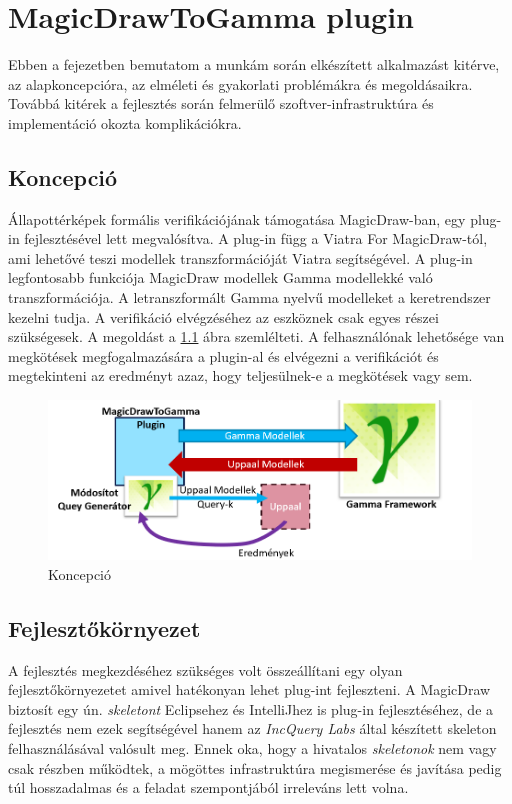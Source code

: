 \chapter{MagicDrawToGamma plugin}\label{chap:contrib}

Ebben a fejezetben bemutatom a munkám során elkészített alkalmazást kitérve, az alapkoncepcióra, az elméleti és gyakorlati problémákra és megoldásaikra. Továbbá kitérek a fejlesztés során felmerülő szoftver-infrastruktúra és implementáció okozta komplikációkra.

\section{Koncepció}
Állapottérképek formális verifikációjának támogatása MagicDraw-ban, egy plug-in fejlesztésével lett megvalósítva. A plug-in függ a Viatra For MagicDraw-tól, ami lehetővé teszi modellek transzformációját Viatra segítségével. A plug-in legfontosabb funkciója MagicDraw modellek Gamma modellekké való transzformációja. A letranszformált Gamma nyelvű modelleket a keretrendszer kezelni tudja. A verifikáció elvégzéséhez az eszköznek csak egyes részei szükségesek. A megoldást a \ref{fig:used-gamma} ábra szemlélteti. A felhasználónak lehetősége van megkötések megfogalmazására a plugin-al és elvégezni a verifikációt és megtekinteni az eredményt azaz, hogy teljesülnek-e a megkötések vagy sem.

\begin{figure}[!ht]
	\centering
	\includegraphics[keepaspectratio, width=150mm]{figures/concept.png}
	\caption{Koncepció}
	\label{fig:used-gamma}
\end{figure}

\section{Fejlesztőkörnyezet}
 A fejlesztés megkezdéséhez szükséges volt összeállítani egy olyan fejlesztőkörnyezetet amivel hatékonyan lehet plug-int fejleszteni. A MagicDraw biztosít egy ún. \emph{skeletont} Eclipsehez és IntelliJhez is plug-in fejlesztéséhez, de a fejlesztés nem ezek segítségével hanem az \emph{IncQuery Labs} által készített skeleton felhasználásával valósult meg. Ennek oka, hogy a hivatalos \emph{skeletonok} nem vagy csak részben működtek, a mögöttes infrastruktúra megismerése és javítása pedig túl hosszadalmas és a feladat szempontjából irreleváns lett volna. 
 

